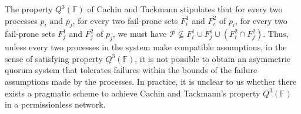 \documentclass[11pt]{article}
\begin{document}

The property $Q^3(\mathbb{F})$ of Cachin and Tackmann stipulates that for every two processes $p_i$ and $p_j$, for every two fail-prone sets $F_i^1$ and $F_i^2$ of $p_i$, for every two fail-prone sets $F_j^1$ and $F_j^2$ of $p_j$, we must have $\mathcal{P}\not\subseteq F_i^1\cup F_j^1\cup \left(F_i^2\cap F_j^2\right)$. Thus, unless every two processes in the system make compatible assumptions, in the sense of satisfying property $Q^3(\mathbb{F})$, it is not possible to obtain an asymmetric quorum system that tolerates failures within the bounds of the failure assumptions made by the processes. In practice, it is unclear to us whether there exists a pragmatic scheme to achieve Cachin and Tackmann's property $Q^3(\mathbb{F})$ in a permissionless network.
\printbibliography





\end{document}
